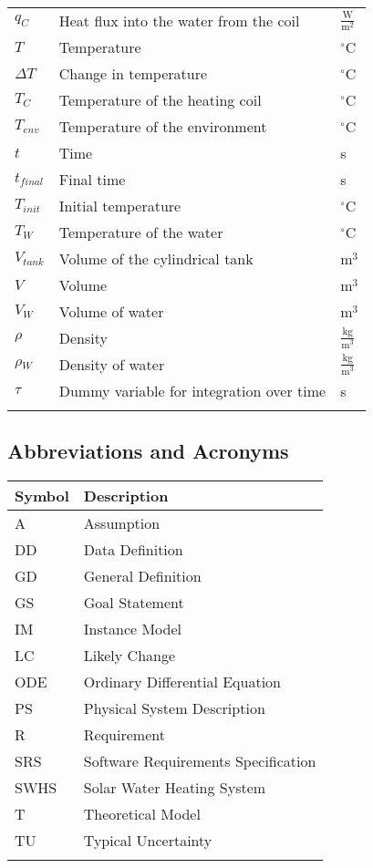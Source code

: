 \documentclass[12pt]{article}
\begin{document}
\begin{longtabu}{l X[l] l}
${q_{C}}$ & Heat flux into the water from the coil & $\frac{\text{W}}{\text{m}^{2}}$
\\
$T$ & Temperature & ${}^{\circ}$C
\\
$\Delta{}T$ & Change in temperature & ${}^{\circ}$C
\\
${T_{C}}$ & Temperature of the heating coil & ${}^{\circ}$C
\\
${T_{env}}$ & Temperature of the environment & ${}^{\circ}$C
\\
$t$ & Time & s
\\
${t_{final}}$ & Final time & s
\\
${T_{init}}$ & Initial temperature & ${}^{\circ}$C
\\
${T_{W}}$ & Temperature of the water & ${}^{\circ}$C
\\
${V_{tank}}$ & Volume of the cylindrical tank & $\text{m}^{3}$
\\
$V$ & Volume & $\text{m}^{3}$
\\
${V_{W}}$ & Volume of water & $\text{m}^{3}$
\\
$\rho{}$ & Density & $\frac{\text{kg}}{\text{m}^{3}}$
\\
${\rho{}_{W}}$ & Density of water & $\frac{\text{kg}}{\text{m}^{3}}$
\\
$\tau{}$ & Dummy variable for integration over time & s
\\
\bottomrule
\label{Table:ToS}
\end{longtabu}
\subsection{Abbreviations and Acronyms}
\label{Sec:TAbbAcc}
\begin{longtable*}{l l}
\toprule
Symbol & Description
\\
\midrule
A & Assumption
\\
DD & Data Definition
\\
GD & General Definition
\\
GS & Goal Statement
\\
IM & Instance Model
\\
LC & Likely Change
\\
ODE & Ordinary Differential Equation
\\
PS & Physical System Description
\\
R & Requirement
\\
SRS & Software Requirements Specification
\\
SWHS & Solar Water Heating System
\\
T & Theoretical Model
\\
TU & Typical Uncertainty
\\
\bottomrule
\label{Table:TAbbAcc}
\end{longtable*}
\end{document}
